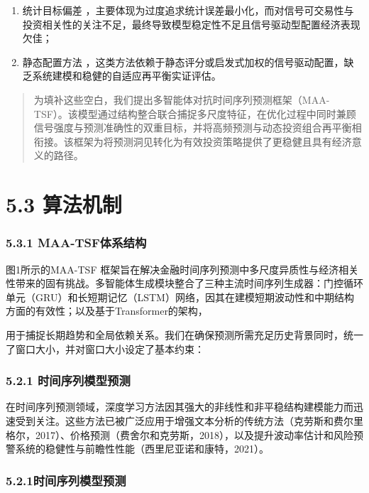 \begin{enumerate}
\def\labelenumi{\arabic{enumi}.}
\setcounter{enumi}{1}
\item
  统计目标偏差
  ，主要体现为过度追求统计误差最小化，而对信号可交易性与投资相关性的关注不足，最终导致模型稳定性不足且信号驱动型配置经济表现欠佳；
\item
  静态配置方法
  ，这类方法依赖于静态评分或启发式加权的信号驱动配置，缺乏系统建模和稳健的自适应再平衡实证评估。
\end{enumerate}

\begin{quote}
为填补这些空白，我们提出多智能体对抗时间序列预测框架（MAA-
TSF）。该模型通过结构整合联合捕捉多尺度特征，在优化过程中同时兼顾信号强度与预测准确性的双重目标，并将高频预测与动态投资组合再平衡相衔接。该框架为将预测洞见转化为有效投资策略提供了更稳健且具有经济意义的路径。
\end{quote}

\section{5.3 算法机制}

\subsubsection{5.3.1 MAA-TSF体系结构}

图1所示的MAA-TSF
框架旨在解决金融时间序列预测中多尺度异质性与经济相关性带来的固有挑战。多智能体生成模块整合了三种主流时间序列生成器：门控循环单元（GRU）和长短期记忆（LSTM）网络，因其在建模短期波动性和中期结构方面的有效性；以及基于Transformer的架构，

用于捕捉长期趋势和全局依赖关系。我们在确保预测所需充足历史背景同时，统一了窗口大小，并对窗口大小设定了基本约束：

\subsubsection{5.2.1
时间序列模型预测}

在时间序列预测领域，深度学习方法因其强大的非线性和非平稳结构建模能力而迅速受到关注。这些方法已被广泛应用于增强文本分析的传统方法（克劳斯和费尔里格尔，2017）、价格预测（费舍尔和克劳斯，2018），以及提升波动率估计和风险预警系统的稳健性与前瞻性性能（西里尼亚诺和康特，2021）。

\subsubsection{5.2.1时间序列模型预测}

